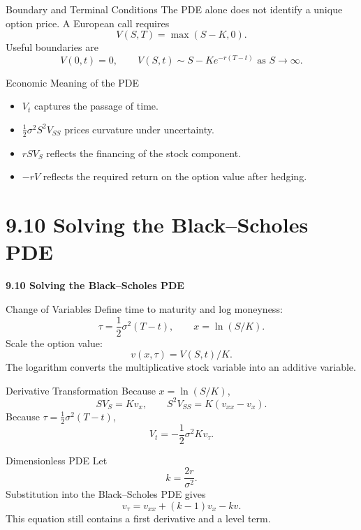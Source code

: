 \documentclass[aspectratio=169]{beamer}
\begin{document}
\begin{frame}[t]{Boundary and Terminal Conditions}
\justifying
The PDE alone does not identify a unique option price. A European call requires
\[V(S,T)=\max(S-K,0).\]
Useful boundaries are
\[V(0,t)=0,\qquad V(S,t)\sim S-Ke^{-r(T-t)}\text{ as }S\to\infty.\]
\end{frame}

\begin{frame}[t]{Economic Meaning of the PDE}
\justifying
\begin{itemize}
\item $V_t$ captures the passage of time.
\item $\tfrac12\sigma^2S^2V_{SS}$ prices curvature under uncertainty.
\item $rSV_S$ reflects the financing of the stock component.
\item $-rV$ reflects the required return on the option value after hedging.
\end{itemize}
\end{frame}

\section{9.10 Solving the Black--Scholes PDE}
\begin{frame}[plain]
\centering\vfill
{\color{TitleBlue}\Large\bfseries 9.10 Solving the Black--Scholes PDE}\par
\vspace{0.5cm}{\large From the pricing equation to the normal distribution}\par
\vfill\end{frame}

\begin{frame}[t]{Change of Variables}
\justifying
Define time to maturity and log moneyness:
\[\tau=\frac12\sigma^2(T-t),\qquad x=\ln(S/K).\]
Scale the option value:
\[v(x,\tau)=V(S,t)/K.\]
The logarithm converts the multiplicative stock variable into an additive variable.
\end{frame}

\begin{frame}[t]{Derivative Transformation}
\justifying
Because $x=\ln(S/K)$,
\[SV_S=Kv_x,\qquad S^2V_{SS}=K(v_{xx}-v_x).\]
Because $\tau=\tfrac12\sigma^2(T-t)$,
\[V_t=-\frac12\sigma^2K v_\tau.\]
\end{frame}

\begin{frame}[t]{Dimensionless PDE}
\justifying
Let
\[k=\frac{2r}{\sigma^2}.\]
Substitution into the Black--Scholes PDE gives
\[v_\tau=v_{xx}+(k-1)v_x-kv.\]
This equation still contains a first derivative and a level term.
\end{frame}
\end{document}
